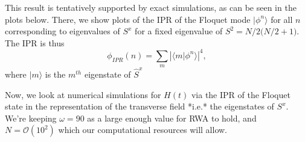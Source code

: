 \documentclass{article}
\begin{document}
This result is tentatively supported by exact simulations, as can be seen in the plots below. There, we show plots of the IPR of the Floquet mode $|\phi^n\rangle$ for all $n$ corresponding to eigenvalues of $S^x$ for a fixed eigenvalue of $S^2 = N/2\big(N/2 + 1\big)$. The IPR is thus
\begin{equation*}
\phi_{IPR}(n) = \sum_m \left\vert\langle m\vert\phi^n\rangle\right\vert^4,
\end{equation*}
where $|m\rangle$ is the $m^{th}$ eigenstate of $\hat{S}^x$


Now, we look at numerical simulations for $H(t)$ via the IPR of the Floquet state in the representation of the transverse field *i.e.* the eigenstates of $S^x$. We're keeping $\omega = 90$ as a large enough value for RWA to hold, and $N=\mathcal{O}(10^2)$ which our computational resources will allow. 
\end{document}
